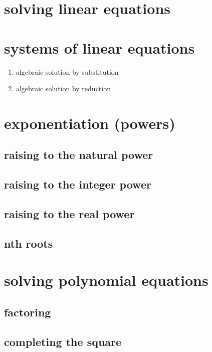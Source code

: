 \documentclass[12pt,paper=letter]{article}
\begin{document}
    \section{solving linear equations}


    \section{systems of linear equations}
    \begin{enumerate}
        \item algebraic solution by substitution
        \item algebraic solution by reduction
    \end{enumerate}


    \section{exponentiation (powers)}

    \subsection{raising to the natural power}

    \subsection{raising to the integer power}

    \subsection{raising to the real power}

    \subsection{nth roots}


    \section{solving polynomial equations}

    \subsection{factoring}

    \subsection{completing the square}
\end{document}
